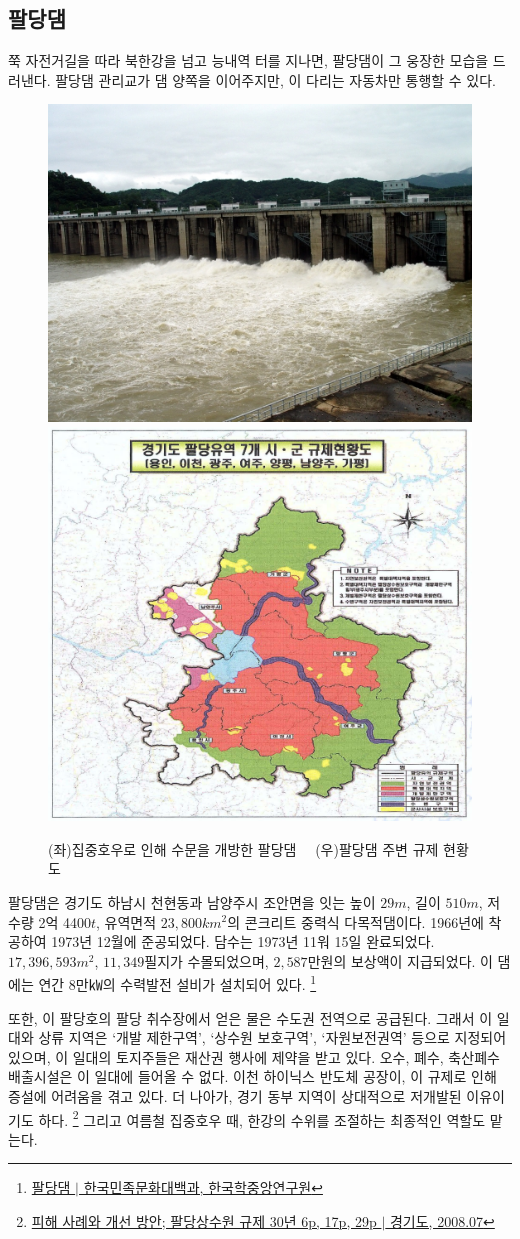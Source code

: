 \subsection{팔당댐}
쭉 자전거길을 따라 북한강을 넘고 능내역 터를 지나면, 팔당댐이 그 웅장한 모습을 드러낸다. 
팔당댐 관리교가 댐 양쪽을 이어주지만, 이 다리는 자동차만 통행할 수 있다.


 
\begin{figure}[ht]
   \centering
   \includegraphics[width=.4\textwidth]{img/팔당댐.jpg}
   \includegraphics[width=.4\textwidth]{img/규제현황도.PNG}
    
   \caption{(좌)집중호우로 인해 수문을 개방한 팔당댐\protect\footnotemark $\quad$ (우)팔당댐 주변 규제 현황도\protect\footnotemark}
   \label{fig:my_labe9}
\end{figure}
\footnotetext{\ref{paldang}}


팔당댐은 경기도 하남시 천현동과 남양주시 조안면을 잇는
높이 $29m$, 길이 $510m$, 저수량 2억 4400$t$, 유역면적 $23,800km^2$의 콘크리트 중력식 다목적댐이다.
1966년에 착공하여 1973년 12월에 준공되었다.
담수는 1973년 11워 15일 완료되었다.
$17,396,593 m^2$, $11,349$필지가 수몰되었으며, $2,587$만원의 보상액이 지급되었다.
이 댐에는 연간 8만㎾의 수력발전 설비가 설치되어 있다.
\footnote{\href{https://terms.naver.com/entry.naver?docId=531161&cid=46631&categoryId=46631}{팔당댐 $|$ 한국민족문화대백과, 한국학중앙연구원}}


또한, 이 팔당호의 팔당 취수장에서 얻은 물은 수도권 전역으로 공급된다.
그래서 이 일대와 상류 지역은 `개발 제한구역', `상수원 보호구역', `자원보전권역'
등으로 지정되어 있으며,
이 일대의 토지주들은 재산권 행사에 제약을 받고 있다.
오수, 폐수, 축산폐수 배출시설은 이 일대에 들어올 수 없다.
이천 하이닉스 반도체 공장이, 이 규제로 인해 증설에 어려움을 겪고 있다.
더 나아가, 경기 동부 지역이 상대적으로 저개발된 이유이기도 하다.
\footnote{\label{paldang}\href{https://memory.library.kr/items/show/37492}{피해 사례와 개선 방안; 팔당상수원 규제 30년 6p, 17p, 29p $|$ 경기도, 2008.07}}
그리고 여름철 집중호우 때, 한강의 수위를 조절하는 최종적인 역할도 맡는다.


